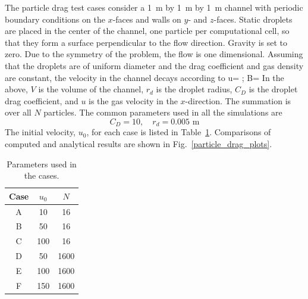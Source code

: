 \documentclass[11pt]{book}
\begin{document}
The particle drag test cases consider a 1~m by 1~m by 1~m
channel with periodic boundary conditions on the $x$-faces and 
walls on $y$- and $z$-faces. Static droplets are placed in the center
of the channel, one particle per computational cell, so that they form a surface
perpendicular to the flow direction. Gravity is set to zero. Due to the symmetry of the problem, the flow is one
dimensional. Assuming that the droplets are of uniform diameter  and
the drag coefficient and gas density are constant, the velocity in
the channel decays according to
\be u=  \quad ; \quad B= \ee
In the above, $V$ is the volume of the channel, $r_{d}$ is the droplet radius, $C_{D}$
is the droplet drag coefficient, and $u$ is the gas velocity in the $x$-direction. The summation is
over all $N$ particles.
The common parameters used in all the simulations are
\[
    C_D=10, \quad r_d=0.005\mbox{ m}
\]
The initial velocity, $u_0$, for each case is listed in Table~\ref{particle_drag_parameters}.
Comparisons of computed and analytical results are shown in Fig.~\ref{particle_drag_plots}.
\begin{table}[ht]
\begin{center}
\caption[Parameters for  cases]{Parameters used in the  cases.}
\label{particle_drag_parameters}
\begin{tabular}{|c|c|c|}
\hline
Case & $u_{0}$ & $N$\tabularnewline
\hline
\hline
A & 10 & 16 \tabularnewline
\hline
B & 50 & 16\tabularnewline
\hline
C & 100 & 16\tabularnewline
\hline
D & 50  & 1600\tabularnewline
\hline
E & 100 & 1600\tabularnewline
\hline
F & 150 & 1600 \tabularnewline
\hline
\end{tabular}
\end{center}
\end{table}
\end{document}
